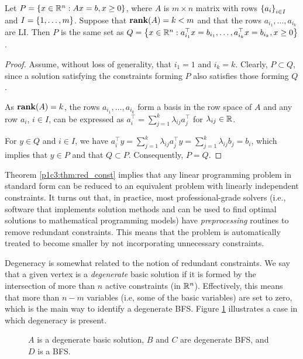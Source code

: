 \begin{theorem}\label{p1c3:thm:red_const}
	Let $P = \left\{ x \in \mathbb{R}^n : Ax = b, x \geq 0 \right \}$, where $A$ is $m \times n$ matrix with rows $\left\{ a_i \right \}_{i \in I}$ and $I = \left\{ 1,\dots,m \right \}$. Suppose that $\mathop{\bf rank}(A) = k < m$ and that the rows $a_{i_1}, \dots, a_{i_k}$ are LI. Then $P$ is the same set as $Q = \left\{  x \in \mathbb{R}^n : a^\top_{i_1}x = b_{i_1}, \dots, a^\top_{i_k}x = b_{i_k}, x \geq 0 \right \}$.
\end{theorem}

\begin{proof}
	Assume, without loss of generality, that $i_1 = 1$ and $i_k = k$. Clearly, $P \subset Q$, since a solution satisfying the constraints forming $P$ also satisfies those forming $Q$.
	
	As $\mathop{\bf rank}(A) = k$, the rows $a_{i_1}, \dots, a_{i_k}$ form a basis in the row space of $A$ and any row $a_i$, $i \in I$, can be expressed as $a^\top_i = \sum_{j=1}^k \lambda_{ij}a_j^\top$ for $\lambda_{ij} \in \mathbb{R}$.
	
	For $y \in Q$ and $i \in I$, we have $a_i^\top y = \sum_{j=1}^k \lambda_{ij}a_j^\top y = \sum_{j=1}^k \lambda_{ij}b_{j} = b_i$, which implies that $y \in P$ and that $Q \subset P$. Consequently, $P = Q$. \qedhere			
\end{proof}

Theorem \ref{p1c3:thm:red_const} implies that any linear programming problem in standard form can be reduced to an equivalent problem with linearly independent constraints. It turns out that, in practice, most professional-grade solvers (i.e., software that implements solution methods and can be used to find optimal solutions to mathematical programming models) have \emph{preprocessing} routines to remove redundant constraints. This means that the problem is automatically treated to become smaller by not incorporating unnecessary constraints. 

Degeneracy is somewhat related to the notion of redundant constraints. We say that a given vertex is a \emph{degenerate} basic solution if it is formed by the intersection of more than $n$ active constraints (in $\mathbb{R}^n$). Effectively, this means that more than $n-m$ variables (i.e, some of the basic variables) are set to zero, which is the main way to identify a degenerate BFS. Figure \ref{p1c3:fig:figure1} illustrates a case in which degeneracy is present.

\begin{figure}[h]
	\caption{$A$ is a degenerate basic solution, $B$ and $C$ are degenerate BFS, and $D$ is a BFS.} \label{p1c3:fig:figure1}
\end{figure} 

